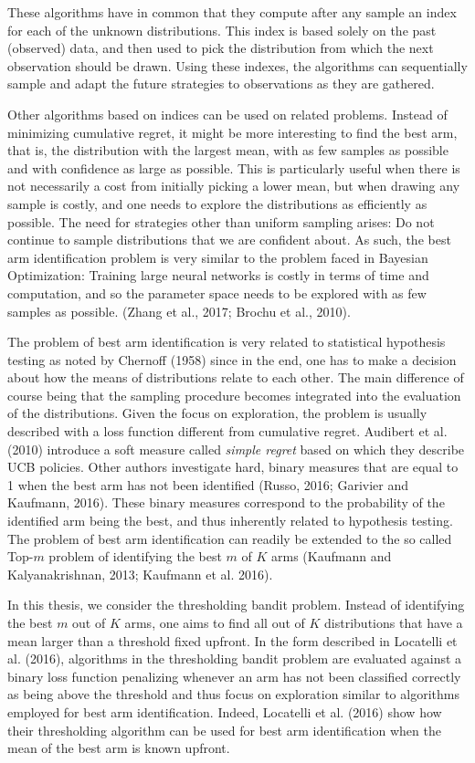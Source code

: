 \documentclass[12pt,]{article}
\begin{document}
These algorithms have in common that they compute after any sample an
index for each of the unknown distributions. This index is based solely
on the past (observed) data, and then used to pick the distribution from
which the next observation should be drawn. Using these indexes, the
algorithms can sequentially sample and adapt the future strategies to
observations as they are gathered.

Other algorithms based on indices can be used on related problems.
Instead of minimizing cumulative regret, it might be more interesting to
find the best arm, that is, the distribution with the largest mean, with
as few samples as possible and with confidence as large as possible.
This is particularly useful when there is not necessarily a cost from
initially picking a lower mean, but when drawing any sample is costly,
and one needs to explore the distributions as efficiently as possible.
The need for strategies other than uniform sampling arises: Do not
continue to sample distributions that we are confident about. As such,
the best arm identification problem is very similar to the problem faced
in Bayesian Optimization: Training large neural networks is costly in
terms of time and computation, and so the parameter space needs to be
explored with as few samples as possible. (Zhang et al., 2017; Brochu et
al., 2010).

The problem of best arm identification is very related to statistical
hypothesis testing as noted by Chernoff (1958) since in the end, one has
to make a decision about how the means of distributions relate to each
other. The main difference of course being that the sampling procedure
becomes integrated into the evaluation of the distributions. Given the
focus on exploration, the problem is usually described with a loss
function different from cumulative regret. Audibert et al. (2010)
introduce a soft measure called \emph{simple regret} based on which they
describe UCB policies. Other authors investigate hard, binary measures
that are equal to 1 when the best arm has not been identified (Russo,
2016; Garivier and Kaufmann, 2016). These binary measures correspond to
the probability of the identified arm being the best, and thus
inherently related to hypothesis testing. The problem of best arm
identification can readily be extended to the so called Top-\(m\)
problem of identifying the best \(m\) of \(K\) arms (Kaufmann and
Kalyanakrishnan, 2013; Kaufmann et al. 2016).

In this thesis, we consider the thresholding bandit problem. Instead of
identifying the best \(m\) out of \(K\) arms, one aims to find all out
of \(K\) distributions that have a mean larger than a threshold fixed
upfront. In the form described in Locatelli et al. (2016), algorithms in
the thresholding bandit problem are evaluated against a binary loss
function penalizing whenever an arm has not been classified correctly as
being above the threshold and thus focus on exploration similar to
algorithms employed for best arm identification. Indeed, Locatelli et
al. (2016) show how their thresholding algorithm can be used for best
arm identification when the mean of the best arm is known upfront.
\end{document}
